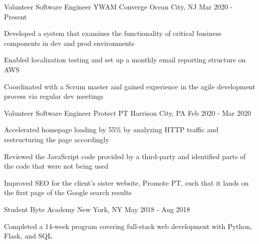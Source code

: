 

\begin{cventries}

\cventry
  {Volunteer Software Engineer} %
  {YWAM Converge} %
  {Ocean City, NJ} %
  {Mar 2020 - Present} %
  {
    \begin{cvitems} %
      \item {Developed a system that examines the functionality of critical business components in dev and prod environments}
      \item {Enabled localization testing and set up a monthly email reporting structure on AWS}
      \item {Coordinated with a Scrum master and gained experience in the agile development process via regular dev meetings}
    \end{cvitems}
  }

\cventry
  {Volunteer Software Engineer} %
  {Protect PT} %
  {Harrison City, PA} %
  {Feb 2020 - Mar 2020} %
  {
    \begin{cvitems} %
      \item {Accelerated homepage loading by 55\% by analyzing HTTP traffic and restructuring the page accordingly}
      \item {Reviewed the JavaScript code provided by a third-party and identified parts of the code that were not being used}
      \item {Improved SEO for the client's sister website, Promote PT, such that it lands on the first page of the Google search results}
    \end{cvitems}
  }

  \cventry
    {Student} %
    {Byte Academy} %
    {New York, NY} %
    {May 2018 - Aug 2018} %
    {
      \begin{cvitems} %
        \item {Completed a 14-week program covering full-stack web development with Python, Flask, and SQL}
      \end{cvitems}
    }


\end{cventries}
